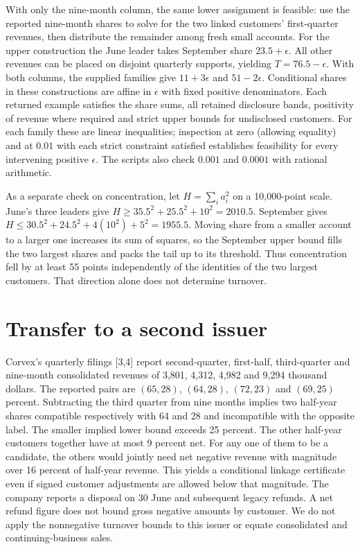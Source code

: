 \documentclass[11pt]{article}
\begin{document}
With only the nine-month column, the same lower assignment is feasible: use the reported nine-month shares to solve for the two linked customers' first-quarter revenues, then distribute the remainder among fresh small accounts. For the upper construction the June leader takes September share $23.5+\epsilon$. All other revenues can be placed on disjoint quarterly supports, yielding $T=76.5-\epsilon$. With both columns, the supplied families give $11+3\epsilon$ and $51-2\epsilon$. Conditional shares in these constructions are affine in $\epsilon$ with fixed positive denominators. Each returned example satisfies the share sums, all retained disclosure bands, positivity of revenue where required and strict upper bounds for undisclosed customers. For each family these are linear inequalities; inspection at zero (allowing equality) and at $0.01$ with each strict constraint satisfied establishes feasibility for every intervening positive $\epsilon$. The scripts also check $0.001$ and $0.0001$ with rational arithmetic.

As a separate check on concentration, let $H=\sum_i a_i^2$ on a 10,000-point scale. June's three leaders give $H\ge35.5^2+25.5^2+10^2=2010.5$. September gives $H\le30.5^2+24.5^2+4(10^2)+5^2=1955.5$. Moving share from a smaller account to a larger one increases its sum of squares, so the September upper bound fills the two largest shares and packs the tail up to its threshold. Thus concentration fell by at least 55 points independently of the identities of the two largest customers. That direction alone does not determine turnover.

\newpage\section{Transfer to a second issuer} Corvex's quarterly filings [3,4] report second-quarter, first-half, third-quarter and nine-month consolidated revenues of 3,801, 4,312, 4,982 and 9,294 thousand dollars. The reported pairs are $(65,28)$, $(64,28)$, $(72,23)$ and $(69,25)$ percent. Subtracting the third quarter from nine months implies two half-year shares compatible respectively with 64 and 28 and incompatible with the opposite label. The smaller implied lower bound exceeds 25 percent. The other half-year customers together have at most 9 percent net. For any one of them to be a candidate, the others would jointly need net negative revenue with magnitude over 16 percent of half-year revenue. This yields a conditional linkage certificate even if signed customer adjustments are allowed below that magnitude. The company reports a disposal on 30 June and subsequent legacy refunds. A net refund figure does not bound gross negative amounts by customer. We do not apply the nonnegative turnover bounds to this issuer or equate consolidated and continuing-business sales.
\end{document}
